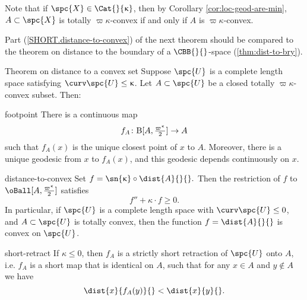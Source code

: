 Note that if $\spc{X}\in\Cat{}{\kappa}$, then by Corollary \ref{cor:loc-geod-are-min},  $A\subset\spc{X}$ is totally $\varpi\kappa$-convex if and only if $A$ is $\varpi\kappa$-convex.


Part (\ref{SHORT.distance-to-convex}) of  the next theorem should be compared to the theorem on distance to the boundary of a $\CBB{}{}$-space (\ref{thm:dist-to-bry}).





\begin{thm}{Theorem on distance to a convex set} 
\label{thm:retract-to-convex} 
Suppose $\spc{U}$ is  a complete  length space satisfying $\curv\spc{U}\le\kappa$.  Let  $A\subset\spc{U} $  be a closed totally $\varpi\kappa$-convex subset. 
Then:

\begin{subthm}{footpoint}
There is a continuous map 
$$f_A\: \oBall[A,\tfrac{\varpi\kappa}{2}]\to A$$
	such that  $f_A(x)$ is the unique closest  point of $x$ to $A$. 
Moreover, there is a unique geodesic from $x$ to $f_A(x)$, and this geodesic depends continuously on $x$.  \end{subthm}



\begin{subthm}{distance-to-convex}
Set
$f=\sn{\kappa}\circ\dist{A}{}{}.$
Then the  restriction of $f$ to  $\oBall[A,\tfrac{\varpi\kappa}{2}]$  satisfies \[f''+\kappa\cdot f\ge 0%
 .\]
In particular, if $\spc{U}$ is a complete  length space  with  $\curv\spc{U}\le0$, and $A\subset\spc{U}$  is  totally convex, then the  function
$f= \dist{A}{}{}$
is convex on $\spc{U}$.
\end{subthm} 

\begin{subthm}{short-retract} 
If $\kappa\le 0$,
then $f_A$ is a strictly short retraction of $ \spc{U}$ onto $A$,
i.e. $f_A$ is a short map
that is identical on $A$, such that for any $x\in A$ and $y\notin A$ we have 
\[\dist{x}{f_A(y)}{}<\dist{x}{y}{}.\]
 \end{subthm}
\end{thm}
